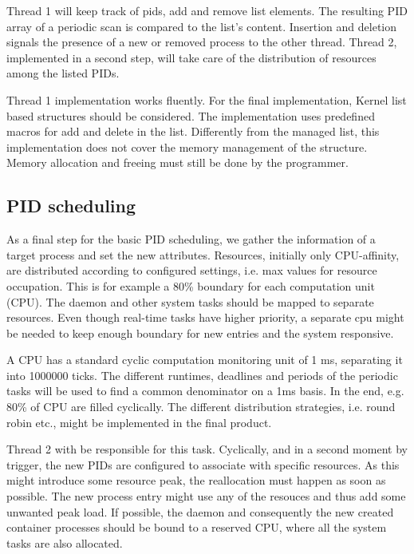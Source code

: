 \documentclass[]{scrartcl}
\begin{document}
Thread 1 will keep track of pids, add and remove list elements. The resulting PID array of a periodic scan is compared to the list's content.
Insertion and deletion signals the presence of a new or removed process to the other thread.
Thread 2, implemented in a second step, will take care of the distribution of resources among the listed PIDs. 

Thread 1 implementation works fluently. For the final implementation, Kernel list based structures should be considered. 
The implementation uses predefined macros for add and delete in the list. Differently from the managed list, this implementation does not cover the memory management of the structure. Memory allocation and freeing must still be done by the programmer.

\subsection{PID scheduling}
 
As a final step for the basic PID scheduling, we gather the information of a target process and set the new attributes. 
Resources, initially only {CPU}-affinity, are distributed according to configured settings, i.e. max values for resource occupation. 
This is for example a 80\% boundary for each computation unit ({CPU}). 
The daemon and other system tasks should be mapped to separate resources. Even though real-time tasks have higher priority, a separate cpu might be needed to keep enough boundary for new entries and the system responsive.

A CPU has a standard cyclic computation monitoring unit of 1 ms, separating it into 1000000 ticks. The different runtimes, deadlines and periods of the periodic tasks will be used to find a common denominator on a 1ms basis. 
In the end, e.g. 80\% of {CPU} are filled cyclically. 
The different distribution strategies, i.e. round robin etc., might be implemented in the final product.

Thread 2 with be responsible for this task. Cyclically, and in a second moment by trigger, the new PIDs are configured to associate with specific resources.
As this might introduce some resource peak, the reallocation must happen as soon as possible. 
The new process entry might use any of the resouces and thus add some unwanted peak load. 
If possible, the daemon and consequently the new created container processes should be bound to a reserved {CPU}, where all the system tasks are also allocated.
\end{document}
